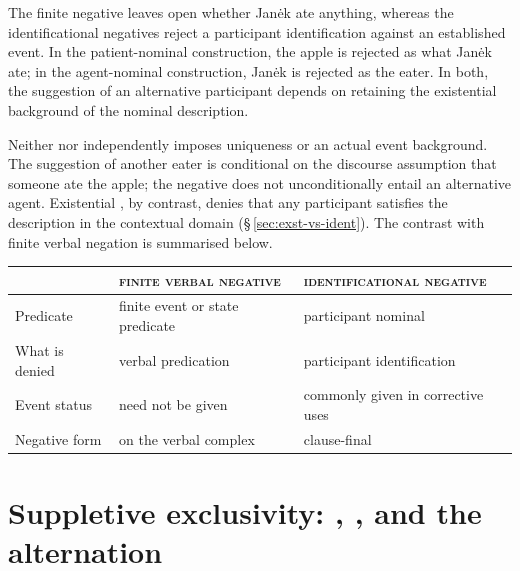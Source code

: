 \noindent The finite negative  leaves open
whether Janėk ate anything, whereas the identificational negatives reject a
participant identification against an established event. In the patient-nominal
construction, the apple is rejected as what Janėk ate; in the agent-nominal
construction, Janėk is rejected as the eater. In both, the suggestion of an
alternative participant depends on retaining the existential background of the
nominal description.

Neither  nor  independently imposes uniqueness or an
actual event background. The suggestion of another eater is conditional on
the discourse assumption that someone ate the apple; the negative does not
unconditionally entail an alternative agent. Existential , by
contrast, denies that any participant satisfies the description in the
contextual domain (§\,\ref{sec:exst-vs-ident}). The contrast with finite
verbal negation is summarised below.

\medskip

\noindent\begin{tabularx}{\linewidth}{l L L}
\toprule
& \textsc{finite verbal negative} & \textsc{identificational negative} \\
\midrule
Predicate & finite event or state predicate & participant nominal \\
What is denied & verbal predication & participant identification \\
Event status & need not be given & commonly given in corrective uses \\
Negative form &  on the verbal complex & clause-final  \\
\bottomrule
\end{tabularx}

\medskip


\section{Suppletive exclusivity: , , and the  alternation}\label{sec:neg-exst-alternation}%
\label{sec:vm-jec-zad}%
\label{sec:vm-jec}

